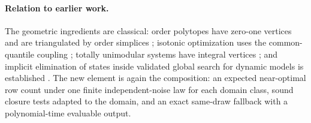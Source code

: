 \paragraph{Relation to earlier work.} The geometric ingredients are
classical: order polytopes have zero-one vertices and are triangulated by
order simplices \citep{stanley1986-two-poset-polytopes}; isotonic optimization uses the
common-quantile coupling \citep{bach2018-efficient-algorithms-for-non-convex}; totally unimodular
systems have integral vertices \citep{hoffman1956-integral-boundary-points-of-convex}; and implicit
elimination of states inside validated global search for dynamic models is
established \citep{wilhelm2019-global-optimization-of-stiff-dynamical}. The new element is again the
composition: an expected near-optimal row count under one finite
independent-noise law for each domain class, sound closure tests adapted to
the domain, and an exact same-draw fallback with a polynomial-time
evaluable output.
